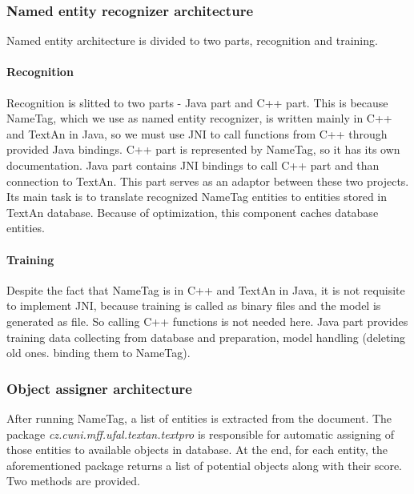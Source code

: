 \subsubsection{Named entity recognizer architecture}

Named entity architecture is divided to two parts, recognition and training.
\paragraph{Recognition} 
Recognition is slitted to two parts - Java part and C++ part. This is because
NameTag, which we use as named entity recognizer, is written mainly in C++ and
TextAn in Java, so we must use JNI to call functions from C++ through provided
Java bindings. C++ part is represented by NameTag, so it has its own documentation.
Java part contains JNI bindings to call C++ part and than connection to TextAn.
This part serves as an adaptor between these two projects. Its main task is
to translate recognized NameTag entities to entities stored in TextAn database.
Because of optimization, this component caches database entities.

\paragraph{Training}
Despite the fact that NameTag is in C++ and TextAn in Java, it is not requisite 
to implement JNI, because training is called as binary files and the model is generated
as file. So calling C++ functions is not needed here. Java part provides
training data collecting from database and preparation, model handling
(deleting old ones. binding them to NameTag).

\subsubsection{Object assigner architecture} 



After running NameTag, a list of entities is extracted from the document. The
package \emph{cz.cuni.mff.ufal.textan.textpro} is responsible for automatic
assigning of those entities to available objects in database. At the end, for 
each entity, the aforementioned package returns a list of potential objects along
with their score. Two methods are provided.

